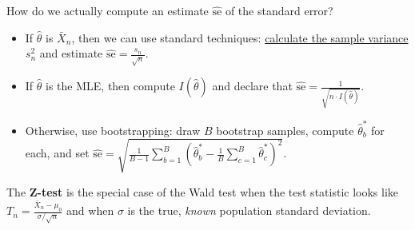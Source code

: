 \begin{remark}
    How do we actually compute an estimate $\widehat{\mathrm{se}}$
    of the standard error?
    \begin{itemize}
        \item If $\hat{\theta}$ is $\bar{X}_n$,
        then we can use standard techniques:
        \href{/18.650/lectures/1-3/#applying-slutsky-s-theorem}{calculate the sample variance} $s_n^2$
        and estimate $\widehat{\mathrm{se}} = \frac{s_n}{\sqrt{n}}$.
        \item If $\hat{\theta}$ is the MLE,
        then compute $I(\hat{\theta})$ and declare that
        $\widehat{\mathrm{se}} = \frac{1}{\sqrt{n \cdot I(\hat{\theta})}}$.
        \item Otherwise, use bootstrapping:
        draw $B$ bootstrap samples, compute $\hat{\theta}_b^*$ for each,
        and set $\widehat{\mathrm{se}} = \sqrt{
            \frac{1}{B - 1} \sum_{b = 1}^B \left(
                \hat{\theta}^*_b - \frac{1}{B} \sum_{c = 1}^B \hat{\theta}^*_c
            \right)^2
        }$.
    \end{itemize}
\end{remark}

The \textbf{Z-test} is the special case of the Wald test
when the test statistic looks like $T_n = \frac{\bar{X}_n - \mu_0}{\sigma / \sqrt{n}}$
and when $\sigma$ is the true, \emph{known} population standard deviation.

